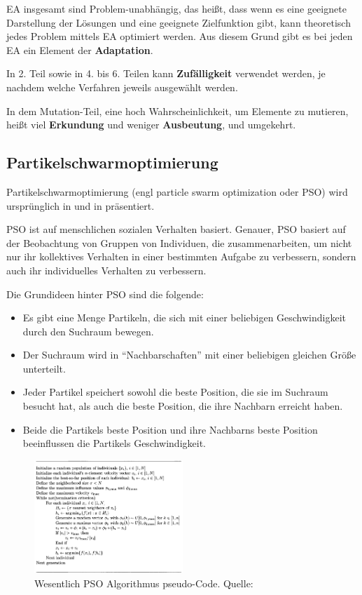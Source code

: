 \documentclass[twoside,twocolumn]{article}
\begin{document}
EA insgesamt sind Problem-unabhängig, das heißt, dass wenn es eine geeignete Darstellung der Lösungen und eine geeignete Zielfunktion gibt, kann theoretisch jedes Problem mittels EA optimiert werden. Aus diesem Grund gibt es bei jeden EA ein Element der \textbf{Adaptation}.\par
In 2. Teil sowie in 4. bis 6. Teilen kann \textbf{Zufälligkeit} verwendet werden, je nachdem welche Verfahren jeweils ausgewählt werden.\par
In dem Mutation-Teil, eine hoch Wahrscheinlichkeit, um Elemente zu mutieren, heißt viel \textbf{Erkundung} und weniger \textbf{Ausbeutung}, und umgekehrt.

\subsection{Partikelschwarmoptimierung}
Partikelschwarmoptimierung (engl particle swarm optimization oder PSO) wird ursprünglich in \cite{kennedy_pso} und in \cite{shi_pso} präsentiert.\par
PSO ist auf menschlichen sozialen Verhalten basiert. \cite{eberhart_pso} Genauer,  PSO basiert auf der Beobachtung von Gruppen von Individuen, die zusammenarbeiten, um nicht nur ihr kollektives Verhalten in einer bestimmten Aufgabe zu verbessern, sondern auch ihr individuelles Verhalten zu verbessern.\par
Die Grundideen hinter PSO sind die folgende:

\begin{itemize}
\item{Es gibt eine Menge Partikeln, die sich mit einer beliebigen Geschwindigkeit durch den Suchraum bewegen.}
\item{Der Suchraum wird in \enquote{Nachbarschaften} mit einer beliebigen gleichen Größe unterteilt.}
\item{Jeder Partikel speichert sowohl die beste Position, die sie im Suchraum besucht hat, als auch die beste Position, die ihre Nachbarn erreicht haben.}
\item{Beide die Partikels beste Position und ihre Nachbarns beste Position beeinflussen die Partikels Geschwindigkeit.}
\end{itemize}

\begin{figure}
\caption{Wesentlich PSO Algorithmus pseudo-Code. Quelle: \cite{wiley_evolutionary}}
\label{fig:pso_pseudo}
\centering
\includegraphics[width=0.5\textwidth]{images/pso_pseudo.png}
\end{figure}
\end{document}

